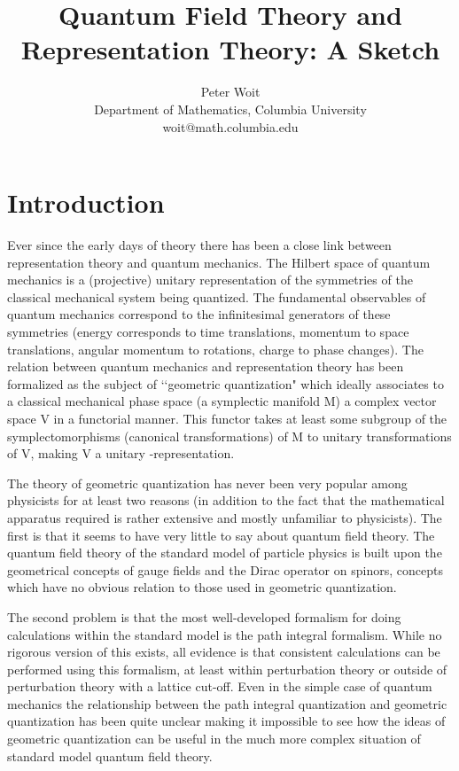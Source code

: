\documentclass[a4paper,a4paper]{article}
\author{Peter Woit \\
Department of Mathematics, Columbia University\\
woit@math.columbia.edu}
\title{Quantum Field Theory and Representation Theory: A Sketch}
\theoremstyle{conjecture}
\begin{document}
\maketitle
\tableofcontents
\section{Introduction}

Ever since the early days of theory there has been a close link
between representation theory and quantum mechanics. The Hilbert
space of quantum mechanics is a (projective) unitary representation of the
symmetries of the classical mechanical system being quantized. The
fundamental observables of quantum mechanics correspond to the
infinitesimal generators of these symmetries (energy corresponds
to time translations, momentum to space translations, angular
momentum to rotations, charge to phase changes). The relation
between quantum mechanics and representation theory has been
formalized as the subject of \lq\lq geometric quantization" which
ideally associates to a classical mechanical phase space (a
symplectic manifold M) a complex vector space V in a functorial
manner. This functor takes at least some subgroup \coordHE{} of the
symplectomorphisms (canonical transformations) of M to unitary
transformations of V, making V a unitary \coordHE{}-representation.

The theory of geometric quantization has never been very popular among physicists for at least
two reasons (in addition to the fact that the mathematical apparatus required is rather
extensive and mostly unfamiliar to physicists). The first is that it seems to have very little
to say about quantum field theory.  The quantum field theory of the standard model of particle
physics is built upon the geometrical concepts of gauge fields and the Dirac operator on
spinors, concepts which have no obvious relation to those used in geometric quantization.

The second problem is that the most well-developed formalism for doing calculations within
the standard model is the path integral formalism.  While no rigorous version of this exists,
all evidence is that consistent calculations can be performed using this formalism, at least
within perturbation theory or outside of perturbation theory with a lattice cut-off. Even in the
simple case of quantum mechanics the relationship between the path integral quantization and
geometric quantization has been quite unclear making it impossible to see how the ideas of
geometric quantization can be useful in the much more complex situation of standard model
quantum field theory.
\end{document}
